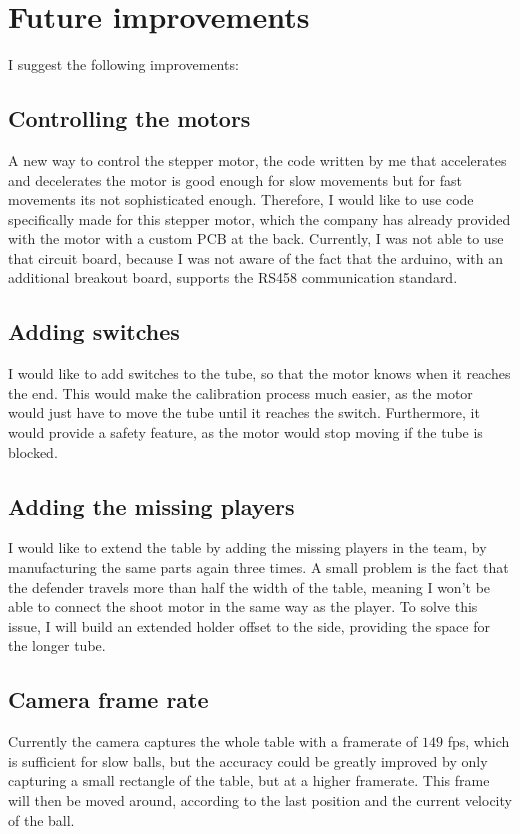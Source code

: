 \section{Future improvements}\label{sec:improvements}
I suggest the following improvements:
\subsection*{Controlling the motors}
A new way to control the stepper motor, the code written by me that accelerates and decelerates the motor is good enough for slow movements but for fast movements its not sophisticated enough.
Therefore, I would like to use code specifically made for this stepper motor, which the company has already provided with the motor with a custom PCB at the back.
Currently, I was not able to use that circuit board, because I was not aware of the fact that the arduino, with an additional breakout board, supports the RS458 communication standard.
\subsection*{Adding switches}
I would like to add switches to the tube, so that the motor knows when it reaches the end.
This would make the calibration process much easier, as the motor would just have to move the tube until it reaches the switch.
Furthermore, it would provide a safety feature, as the motor would stop moving if the tube is blocked.
\subsection*{Adding the missing players}
I would like to extend the table by adding the missing players in the team, by manufacturing the same parts again three times.
A small problem is the fact that the defender travels more than half the width of the table, meaning I won't be able to connect the shoot motor in the same way as the player.
To solve this issue, I will build an extended holder offset to the side, providing the space for the longer tube.
\subsection*{Camera frame rate}
Currently the camera captures the whole table with a framerate of $149$ fps, which is sufficient for slow balls, but the accuracy could be greatly improved by only capturing a small rectangle of the table, but at a higher framerate.
This frame will then be moved around, according to the last position and the current velocity of the ball.
